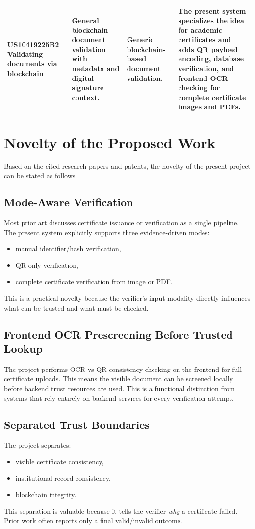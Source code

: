 \documentclass[12pt,a4paper]{article}
\begin{document}
\begin{longtable}{p{3cm}p{4cm}p{5.2cm}p{3.4cm}}
\textbf{US10419225B2} \newline Validating documents via blockchain & General blockchain document validation with metadata and digital signature context. & Generic blockchain-based document validation. & The present system specializes the idea for academic certificates and adds QR payload encoding, database verification, and frontend OCR checking for complete certificate images and PDFs. \\
\bottomrule
\end{longtable}

\section{Novelty of the Proposed Work}
Based on the cited research papers and patents, the novelty of the present project can be stated as follows:

\subsection{Mode-Aware Verification}
Most prior art discusses certificate issuance or verification as a single pipeline. The present system explicitly supports three evidence-driven modes:
\begin{itemize}[leftmargin=1.5em]
\item manual identifier/hash verification,
\item QR-only verification,
\item complete certificate verification from image or PDF.
\end{itemize}
This is a practical novelty because the verifier's input modality directly influences what can be trusted and what must be checked.

\subsection{Frontend OCR Prescreening Before Trusted Lookup}
The project performs OCR-vs-QR consistency checking on the frontend for full-certificate uploads. This means the visible document can be screened locally before backend trust resources are used. This is a functional distinction from systems that rely entirely on backend services for every verification attempt.

\subsection{Separated Trust Boundaries}
The project separates:
\begin{itemize}[leftmargin=1.5em]
\item visible certificate consistency,
\item institutional record consistency,
\item blockchain integrity.
\end{itemize}
This separation is valuable because it tells the verifier \emph{why} a certificate failed. Prior work often reports only a final valid/invalid outcome.
\end{document}
